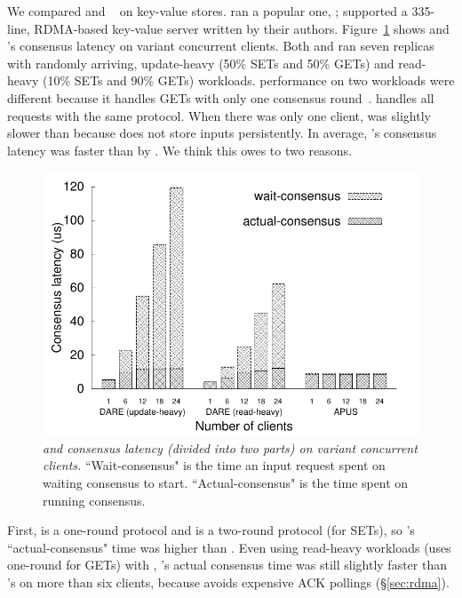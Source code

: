We compared \xxx and \dare~\cite{dare:hpdc15} on key-value stores. \xxx ran a 
popular one, \redis; \dare supported a 335-line, RDMA-based key-value 
server written by their authors. Figure~\ref{fig:compare} shows \xxx and 
\dare's consensus latency on variant concurrent clients. Both \xxx and \dare ran 
seven replicas with randomly arriving, update-heavy (50\% SETs and 50\% GETs) 
and read-heavy (10\% SETs and 90\% GETs) workloads. \dare performance on two 
workloads were different because it handles GETs with only one consensus 
round~\cite{dare:hpdc15}. \xxx handles all requests with the same protocol. When 
there was only one client, \xxx was slightly slower than \dare because \dare 
does not store inputs persistently. In average, \xxx's 
consensus latency was faster than \dare by \fasterDARE. We think this owes to 
two reasons.

\begin{figure}[h]
\centering
\vspace{-.10in}
\includegraphics[width=.4\textwidth]{figures/server-processing-compare}
\vspace{-.1in}
\caption{{\em \xxx and \dare consensus latency (divided into two parts) on 
variant concurrent clients.} 
``Wait-consensus" is the time an input request spent on waiting consensus to 
start. ``Actual-consensus" is the time spent on running consensus.}
\label{fig:compare}
\vspace{-.25in}
\end{figure}




First, \xxx is a one-round protocol and \dare is a two-round protocol (for 
SETs), so \dare's ``actual-consensus" time was \fasterDAREconsensusonly higher 
than \xxx. Even using read-heavy workloads (\dare uses one-round for GETs) 
with \xxx, \xxx's actual consensus time was still slightly faster than \dare's 
on more than six clients, because \xxx avoids expensive ACK 
pollings (\S\ref{sec:rdma}).

